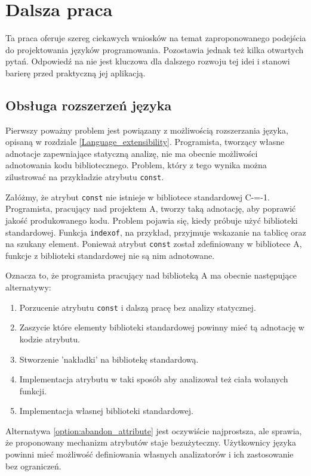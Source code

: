 \section{Dalsza praca}

Ta praca oferuje szereg ciekawych wniosków na temat zaproponowanego podejścia do projektowania języków programowania.
Pozostawia jednak też kilka otwartych pytań.
Odpowiedź na nie jest kluczowa dla dalszego rozwoju tej idei i stanowi barierę przed praktyczną jej aplikacją.

\subsection{Obsługa rozszerzeń języka}
\label{further:language_extension}
Pierwszy poważny problem jest powiązany z możliwością rozszerzania języka, opisaną w rozdziale \ref{Language_extensibility}.
Programista, tworzący własne adnotacje zapewniające statyczną analizę, nie ma obecnie możliwości adnotowania kodu bibliotecznego.
Problem, który z tego wynika można zilustrować na przykładzie atrybutu \lstinline{const}.

Załóżmy, że atrybut \lstinline{const} nie istnieje w bibliotece standardowej C-=-1.
Programista, pracujący nad projektem A, tworzy taką adnotację, aby poprawić jakość produkowanego kodu.
Problem pojawia się, kiedy próbuje użyć biblioteki standardowej.
Funkcja \lstinline{indexof}, na przykład, przyjmuje wskazanie na tablicę oraz na szukany element.
Ponieważ atrybut \lstinline{const} został zdefiniowany w bibliotece A, funkcje z biblioteki standardowej nie są nim adnotowane.

Oznacza to, że programista pracujący nad biblioteką A ma obecnie następujące alternatywy:
\begin{enumerate}
	\item\label{option:abandon_attribute} Porzucenie atrybutu \lstinline{const} i dalszą pracę bez analizy statycznej.
	\item\label{option:embed_in_attribute} Zaszycie które elementy biblioteki standardowej powinny mieć tą adnotację w kodzie atrybutu.
	\item\label{option:std_library_fascade} Stworzenie 'nakładki' na bibliotekę standardową.%
	\item\label{option:analize_function_bodies} Implementacja atrybutu w taki sposób aby analizował też ciała wołanych funkcji.
	\item\label{option:own_std_lib} Implementacja własnej biblioteki standardowej.
\end{enumerate}
Alternatywa \ref{option:abandon_attribute} jest oczywiście najprostsza, ale sprawia, że proponowany mechanizm atrybutów staje bezużyteczny. 
Użytkownicy języka powinni mieć możliwość definiowania własnych analizatorów i ich zastosowanie bez ograniczeń.

